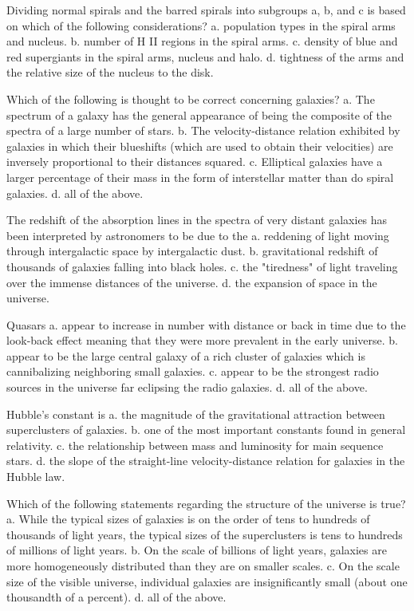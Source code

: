     Dividing normal spirals and the barred spirals into subgroups a, b, and c is based on which of the following considerations?
    a. population types in the spiral arms and nucleus.
    b. number of H II regions in the spiral arms.
    c. density of blue and red supergiants in the spiral arms, nucleus and halo.
    d. tightness of the arms and the relative size of the nucleus to the disk.

    Which of the following is thought to be correct concerning galaxies?
    a. The spectrum of a galaxy has the general appearance of being the composite of the spectra of a large number of stars.
    b. The velocity-distance relation exhibited by galaxies in which their blueshifts (which are used to obtain their velocities) are inversely proportional to their distances squared.
    c. Elliptical galaxies have a larger percentage of their mass in the form of interstellar matter than do spiral galaxies.
    d. all of the above.

    The redshift of the absorption lines in the spectra of very distant galaxies has been interpreted by astronomers to be due to the
    a. reddening of light moving through intergalactic space by intergalactic dust.
    b. gravitational redshift of thousands of galaxies falling into black holes.
    c. the "tiredness" of light traveling over the immense distances of the universe.
    d. the expansion of space in the universe.

    Quasars
    a. appear to increase in number with distance or back in time due to the look-back effect meaning that they were more prevalent in the early universe.
    b. appear to be the large central galaxy of a rich cluster of galaxies which is cannibalizing neighboring small galaxies.
    c. appear to be the strongest radio sources in the universe far eclipsing the radio galaxies.
    d. all of the above.

    Hubble's constant is
    a. the magnitude of the gravitational attraction between superclusters of galaxies.
    b. one of the most important constants found in general relativity.
    c. the relationship between mass and luminosity for main sequence stars.
    d. the slope of the straight-line velocity-distance relation for galaxies in the Hubble law.

    Which of the following statements regarding the structure of the universe is true?
    a. While the typical sizes of galaxies is on the order of tens to hundreds of thousands of light years, the typical sizes of the superclusters is tens to hundreds of millions of light years.
    b. On the scale of billions of light years, galaxies are more homogeneously distributed than they are on smaller scales.
    c. On the scale size of the visible universe, individual galaxies are insignificantly small (about one thousandth of a percent).
    d. all of the above.

